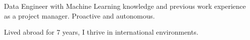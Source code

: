 

\begin{cvparagraph}

Data Engineer with Machine Learning knowledge and previous work experience as a project manager. 
Proactive and autonomous.

Lived abroad for 7 years, I thrive in international environments. 
\end{cvparagraph}
